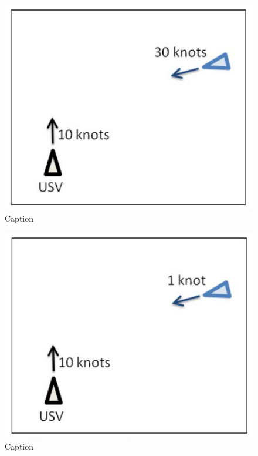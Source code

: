         \begin{figure}
            \centering
            \includegraphics{fig/chap1/colregs_applicable.png}
            \caption{Caption}
            \label{fig:Kuwata2014_colregApplicable}
        \end{figure}
        
        \begin{figure}
            \centering
            \includegraphics{fig/chap1/colregs_na.png}
            \caption{Caption}
            \label{fig:Kuwata2014_colregNA}
        \end{figure}